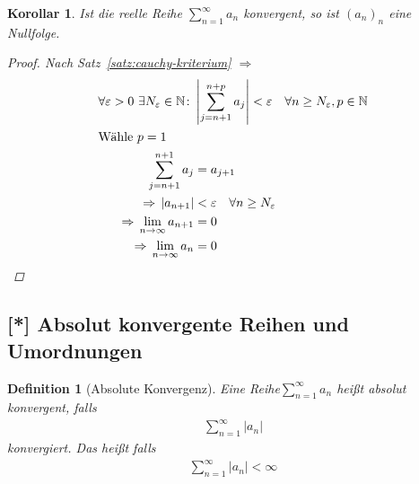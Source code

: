 \documentclass[11pt, twoside, a4paper]{article}
\theoremstyle{plain}
\newtheorem{definition}[blockelement]{Definition}
\newtheorem{korollar}[blockelement]{Korollar}
\newcommand{\abs}[1]{\left|#1\right|}
\newcommand{\impl}[0]{\Rightarrow{}}
\newcommand{\fromto}{\rightarrow{}}
\newcommand{\naturalnumbers}{\mathbb{N}}
\newcommand{\ntoinfty}[0]{n\fromto\infty}
\begin{document}
    \begin{korollar} %
        \label{korollar:folge-von-reihe-nullfolge}
        Ist die reelle Reihe $\sum_{n=1}^{\infty} a_n$ konvergent, so ist $(a_n)_n$ eine Nullfolge.
        \begin{proof}
            Nach Satz~\ref{satz:cauchy-kriterium} $\impl$
            \begin{align*}
                \forall \varepsilon > 0~\exists N_{\varepsilon}\in\naturalnumbers\colon &\abs{\sum_{j=n+1}^{n+p} a_j} < \varepsilon\quad\forall n\geq N_{\varepsilon}, p\in\naturalnumbers\\
                \intertext{Wähle $p=1$}
                \sum_{j=n+1}^{n+1} a_{j} &= a_{j+1}\\
                \impl \abs{a_{n+1}} &< \varepsilon\quad \forall n\geq N_{\varepsilon}\\
                \impl \lim_{\ntoinfty} a_{n+1} &= 0\\
                \impl \lim_{\ntoinfty} a_{n} &= 0\qedhere
            \end{align*}
        \end{proof}
    \end{korollar}

    \subsection{[*] Absolut konvergente Reihen und Umordnungen}

    \begin{definition}[Absolute Konvergenz] %
        Eine Reihe$\sum_{n=1}^{\infty} a_n$ heißt absolut konvergent, falls
        \begin{align*}
            \sum_{n=1}^{\infty} \abs{a_n}
        \end{align*}
        konvergiert. Das heißt falls
        \begin{align*}
            \sum_{n=1}^{\infty} \abs{a_n} < \infty
        \end{align*}
    \end{definition}
\end{document}
